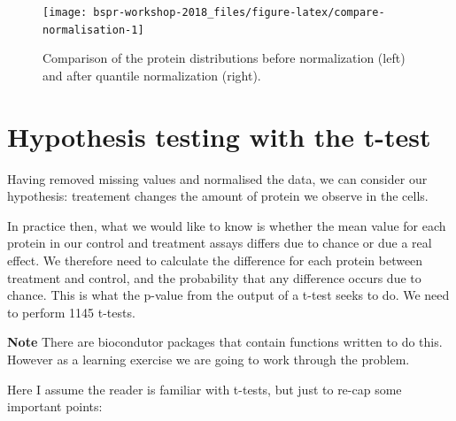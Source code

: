 \documentclass[12pt,]{book}
\newenvironment{Shaded}{\begin{snugshade}}{\end{snugshade}}
\newcommand{\KeywordTok}[1]{\textcolor[rgb]{0.13,0.29,0.53}{\textbf{#1}}}
\newcommand{\DecValTok}[1]{\textcolor[rgb]{0.00,0.00,0.81}{#1}}
\newcommand{\StringTok}[1]{\textcolor[rgb]{0.31,0.60,0.02}{#1}}
\newcommand{\OperatorTok}[1]{\textcolor[rgb]{0.81,0.36,0.00}{\textbf{#1}}}
\newcommand{\NormalTok}[1]{#1}
\theoremstyle{definition}
\theoremstyle{definition}
\theoremstyle{definition}
\theoremstyle{remark}
\begin{document}
\begin{Shaded}
\end{Shaded}




\begin{figure}

{\centering \texttt{[image: bspr-workshop-2018\_files/figure-latex/compare-normalisation-1]} 

}

\caption{Comparison of the protein distributions before
normalization (left) and after quantile normalization (right).}\label{fig:compare-normalisation}
\end{figure}

\section{Hypothesis testing with the
t-test}\label{hypothesis-testing-with-the-t-test}

Having removed missing values and normalised the data, we can consider
our hypothesis: treatement changes the amount of protein we observe in
the cells.

In practice then, what we would like to know is whether the mean value
for each protein in our control and treatment assays differs due to
chance or due a real effect. We therefore need to calculate the
difference for each protein between treatment and control, and the
probability that any difference occurs due to chance. This is what the
p-value from the output of a t-test seeks to do. We need to perform 1145
t-tests.

\textbf{Note} There are biocondutor packages that contain functions
written to do this. However as a learning exercise we are going to work
through the problem.

Here I assume the reader is familiar with t-tests, but just to re-cap
some important points:
\end{document}
